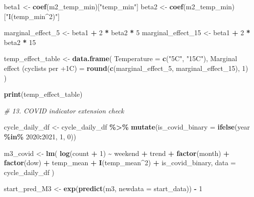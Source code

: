 \documentclass[
]{article}
\newenvironment{Shaded}{\begin{snugshade}}{\end{snugshade}}
\newcommand{\AttributeTok}[1]{\textcolor[rgb]{0.13,0.29,0.53}{#1}}
\newcommand{\CommentTok}[1]{\textcolor[rgb]{0.56,0.35,0.01}{\textit{#1}}}
\newcommand{\DecValTok}[1]{\textcolor[rgb]{0.00,0.00,0.81}{#1}}
\newcommand{\FunctionTok}[1]{\textcolor[rgb]{0.13,0.29,0.53}{\textbf{#1}}}
\newcommand{\NormalTok}[1]{#1}
\newcommand{\OtherTok}[1]{\textcolor[rgb]{0.56,0.35,0.01}{#1}}
\newcommand{\SpecialCharTok}[1]{\textcolor[rgb]{0.81,0.36,0.00}{\textbf{#1}}}
\newcommand{\StringTok}[1]{\textcolor[rgb]{0.31,0.60,0.02}{#1}}
\begin{document}
\begin{Shaded}
\begin{Highlighting}[]
\NormalTok{beta1 }\OtherTok{\textless{}{-}} \FunctionTok{coef}\NormalTok{(m2\_temp\_min)[}\StringTok{"temp\_min"}\NormalTok{]}
\NormalTok{beta2 }\OtherTok{\textless{}{-}} \FunctionTok{coef}\NormalTok{(m2\_temp\_min)[}\StringTok{"I(temp\_min\^{}2)"}\NormalTok{]}

\NormalTok{marginal\_effect\_5 }\OtherTok{\textless{}{-}}\NormalTok{ beta1 }\SpecialCharTok{+} \DecValTok{2} \SpecialCharTok{*}\NormalTok{ beta2 }\SpecialCharTok{*} \DecValTok{5}
\NormalTok{marginal\_effect\_15 }\OtherTok{\textless{}{-}}\NormalTok{ beta1 }\SpecialCharTok{+} \DecValTok{2} \SpecialCharTok{*}\NormalTok{ beta2 }\SpecialCharTok{*} \DecValTok{15}

\NormalTok{temp\_effect\_table }\OtherTok{\textless{}{-}} \FunctionTok{data.frame}\NormalTok{(}
  \AttributeTok{Temperature =} \FunctionTok{c}\NormalTok{(}\StringTok{"5C"}\NormalTok{, }\StringTok{"15C"}\NormalTok{),}
  \StringTok{\textasciigrave{}}\AttributeTok{Marginal effect (cyclists per +1C)}\StringTok{\textasciigrave{}} \OtherTok{=} \FunctionTok{round}\NormalTok{(}\FunctionTok{c}\NormalTok{(marginal\_effect\_5, marginal\_effect\_15), }\DecValTok{1}\NormalTok{)}
\NormalTok{)}

\FunctionTok{print}\NormalTok{(temp\_effect\_table)}

\CommentTok{\# 13. COVID indicator extension check}

\NormalTok{cycle\_daily\_df }\OtherTok{\textless{}{-}}\NormalTok{ cycle\_daily\_df }\SpecialCharTok{\%\textgreater{}\%}
  \FunctionTok{mutate}\NormalTok{(}\AttributeTok{is\_covid\_binary =} \FunctionTok{ifelse}\NormalTok{(year }\SpecialCharTok{\%in\%} \DecValTok{2020}\SpecialCharTok{:}\DecValTok{2021}\NormalTok{, }\DecValTok{1}\NormalTok{, }\DecValTok{0}\NormalTok{))}

\NormalTok{m3\_covid }\OtherTok{\textless{}{-}} \FunctionTok{lm}\NormalTok{(}
  \FunctionTok{log}\NormalTok{(count }\SpecialCharTok{+} \DecValTok{1}\NormalTok{) }\SpecialCharTok{\textasciitilde{}}\NormalTok{ weekend }\SpecialCharTok{+}\NormalTok{ trend }\SpecialCharTok{+} \FunctionTok{factor}\NormalTok{(month) }\SpecialCharTok{+} \FunctionTok{factor}\NormalTok{(dow) }\SpecialCharTok{+}
\NormalTok{    temp\_mean }\SpecialCharTok{+} \FunctionTok{I}\NormalTok{(temp\_mean}\SpecialCharTok{\^{}}\DecValTok{2}\NormalTok{) }\SpecialCharTok{+}\NormalTok{ is\_covid\_binary,}
  \AttributeTok{data =}\NormalTok{ cycle\_daily\_df}
\NormalTok{)}

\NormalTok{start\_pred\_M3 }\OtherTok{\textless{}{-}} \FunctionTok{exp}\NormalTok{(}\FunctionTok{predict}\NormalTok{(m3, }\AttributeTok{newdata =}\NormalTok{ start\_data)) }\SpecialCharTok{{-}} \DecValTok{1}


\end{Highlighting}
\end{Shaded}
\end{document}

